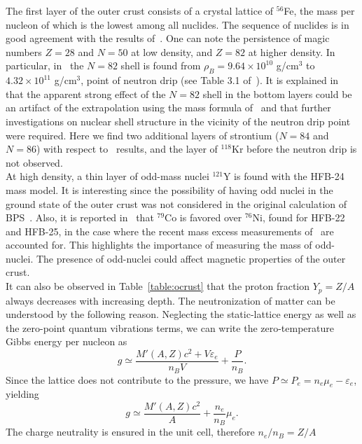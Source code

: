 The first layer of the outer crust consists of a crystal lattice of $^{56}$Fe,
the mass per nucleon of which is the lowest among all nuclides. The sequence of
nuclides is in good agreement with the results of~\cite{Haensel1994}. One can note
the persistence of magic numbers $Z=28$ and $N=50$ at low density, and $Z=82$ at
higher density. In particular, in~\cite{Haensel1994} the $N=82$ shell 
is found from $\rho_B = 9.64\times 10^{10}$ g/cm$^3$ to $4.32\times 10^{11}$
g/cm$^3$, point of neutron drip (see Table 3.1 of~\cite{Haensel2007}). It is 
explained in~\cite{Haensel2007} that 
the apparent strong effect of the $N=82$ shell in the bottom layers could be an 
artifact of the extrapolation using the mass formula of~\cite{Moller1988} and
that further investigations on nuclear shell structure in the vicinity of the
neutron drip point were required. Here we find two additional layers of
strontium ($N=84$ and $N=86$) with respect to~\cite{Haensel1994} results, and
the layer of $^{118}$Kr before the neutron drip is not observed.\\
At high density, a thin layer of odd-mass nuclei $^{121}$Y is found
with the HFB-24 mass model. It is interesting since the possibility of having 
odd nuclei in the ground state of the outer crust was not considered in the
original calculation of BPS~\cite{BPS}. Also, it is reported
in~\cite{Pearson2018} that $^{79}$Co is favored over $^{76}$Ni, found
for HFB-22 and HFB-25, in the case where the recent mass excess measurements
of~\cite{Welker2017} are accounted for. This highlights the importance
of measuring the mass of odd-nuclei. The presence of odd-nuclei could affect
magnetic properties of the outer crust.\\
It can also be observed in Table~\ref{table:ocrust} that the proton fraction 
$Y_p = Z/A$ always decreases with increasing depth. The
neutronization of matter can be understood by the following reason. Neglecting 
the static-lattice energy as well as the zero-point quantum vibrations
terms, we can write the zero-temperature Gibbs energy per nucleon as
%
\begin{equation}
  g \simeq \frac{M'(A,Z)c^2 + V\varepsilon_e}{n_BV} + \frac{P}{n_B}.
\end{equation}
%
Since the lattice does not contribute to the pressure, we have $P \simeq P_e =
n_e\mu_e - \varepsilon_e$, yielding
%
\begin{equation}
  g \simeq \frac{M'(A,Z)c^2}{A} + \frac{n_e}{n_B}\mu_e.
\end{equation}
%
The charge neutrality is ensured in the unit cell, therefore $n_e/n_B = Z/A$ 

